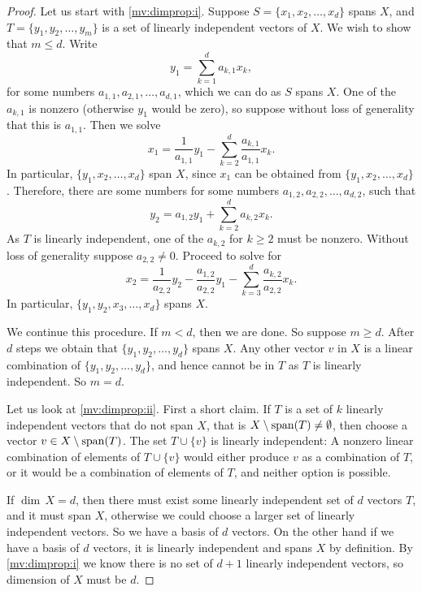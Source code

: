 \begin{proof}
Let us start with \ref{mv:dimprop:i}.
Suppose $S = \{ x_1 , x_2, \ldots, x_d \}$ spans $X$, and
$T = \{ y_1, y_2, \ldots, y_m \}$ is a set of linearly independent
vectors of $X$.  We wish to show that $m \leq d$.
Write
\begin{equation*}
y_1 = \sum_{k=1}^d a_{k,1} x_k ,
\end{equation*}
for some numbers $a_{1,1},a_{2,1},\ldots,a_{d,1}$,
which we can do as $S$ spans $X$.  One of the
$a_{k,1}$ is nonzero (otherwise $y_1$ would be zero),
so suppose without loss of generality that this
is $a_{1,1}$.  Then we solve
\begin{equation*}
x_1 = \frac{1}{a_{1,1}} y_1 - \sum_{k=2}^d \frac{a_{k,1}}{a_{1,1}} x_k .
\end{equation*}
In particular, $\{ y_1 , x_2, \ldots, x_d \}$ span $X$, since $x_1$ can be
obtained from $\{ y_1 , x_2, \ldots, x_d \}$.  Therefore, there are some numbers
for some numbers $a_{1,2},a_{2,2},\ldots,a_{d,2}$, such that
\begin{equation*}
y_2 = a_{1,2} y_1 + \sum_{k=2}^d a_{k,2} x_k .
\end{equation*}
As $T$ is linearly independent, one of the $a_{k,2}$
for $k \geq 2$ must be nonzero.  Without loss of generality suppose 
$a_{2,2} \not= 0$.  Proceed to solve for 
\begin{equation*}
x_2 = \frac{1}{a_{2,2}} y_2 - \frac{a_{1,2}}{a_{2,2}} y_1 - \sum_{k=3}^d
\frac{a_{k,2}}{a_{2,2}} x_k .
\end{equation*}
In particular,
$\{ y_1 , y_2, x_3, \ldots, x_d \}$ spans $X$.

We continue this procedure.  If $m < d$, then we are done.  So suppose
$m \geq d$.
After $d$ steps we obtain that 
$\{ y_1 , y_2, \ldots, y_d \}$ spans $X$.  Any
other vector $v$ in $X$ is a linear combination of
$\{ y_1 , y_2, \ldots, y_d \}$, and hence cannot be in $T$ as $T$ is
linearly independent.  So $m = d$.

Let us look at \ref{mv:dimprop:ii}.
First a short claim.
If $T$ is a set of $k$ linearly independent vectors
that do not span $X$, that is $X \setminus
\operatorname{span} (T) \not= \emptyset$, then choose a vector $v \in X \setminus
\operatorname{span} (T)$.  The set $T \cup \{ v \}$ is linearly independent:
A nonzero linear combination of elements of $T \cup \{ v \}$ would either
produce $v$ as a combination of $T$, or it would be a combination of
elements of $T$, and neither option is possible.

If $\dim \, X = d$,
then there must exist some linearly independent set of $d$ vectors $T$,
and it must span $X$, otherwise we could choose a larger set of linearly
independent vectors.  So we have a basis of $d$ vectors.
On the other hand if we have a basis of $d$ vectors,
it is linearly independent and spans $X$ by definition.
By \ref{mv:dimprop:i} we know
there is no set of $d+1$ linearly independent vectors,
so dimension of $X$ must be $d$.


\end{proof}
